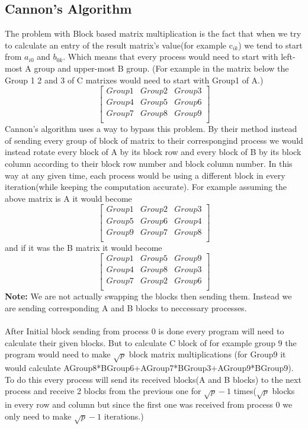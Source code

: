 \subsection{Cannon's Algorithm}
The problem with Block based matrix multiplication is the fact that when we try to calculate an entry of the result matrix's value(for example c$_{ik}$) we tend to start from $a_{i0}$ and $b_{0k}$. Which means that every process would need to start with left-most A group and upper-most B group. (For example in the matrix below the Group 1 2 and 3 of C matrixes would need to start with Group1 of A.)
\[ 
\begin{bmatrix}
Group1 & Group2 & Group3\\
Group4 & Group5 & Group6\\
Group7 & Group8 & Group9\\
\end{bmatrix}
\]
Cannon's algorithm uses a way to bypass this problem. By their method instead of sending every group of block of matrix to their correspongind process we would instead rotate every block of A by its block row and every block of B by its block column according to their block row number and block column number. In this way at any given time, each process would be using a different block in every iteration(while keeping the computation accurate). For example assuming the above matrix is A it would become
\[ 
\begin{bmatrix}
Group1 & Group2 & Group3\\
Group5 & Group6 & Group4\\
Group9 & Group7 & Group8\\
\end{bmatrix}
\]
and if it was the B matrix it would become
\[ 
\begin{bmatrix}
Group1 & Group5 & Group9\\
Group4 & Group8 & Group3\\
Group7 & Group2 & Group6\\
\end{bmatrix}
\]
\textbf{Note:} We are not actually swapping the blocks then sending them. Instead we are sending corresponding A and B blocks to neccessary processes.\\
\\
After Initial block sending from process 0 is done every program will need to calculate their given blocks. But to calculate C block of for example group 9 the program would need to make $\sqrt{p}$ block matrix multiplications (for Group9 it would calculate AGroup8*BGroup6+AGroup7*BGroup3+AGroup9*BGroup9). To do this every process will send its received blocks(A and B blocks) to the next process and receive 2 blocks from the previous one for $\sqrt{p}-1$ times($\sqrt{p}$ blocks in every row and column but since the first one was received from process 0 we only need to make $\sqrt{p}-1$ iterations.)\\
